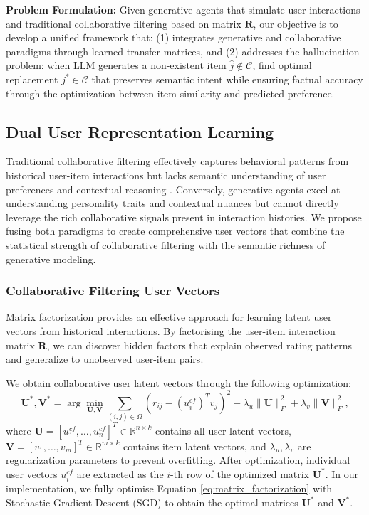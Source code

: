 \documentclass[acmsmall]{acmart}
\begin{document}
\textbf{Problem Formulation:} Given generative agents that simulate user interactions and traditional collaborative filtering based on matrix $\mathbf{R}$, our objective is to develop a unified framework that: (1) integrates generative and collaborative paradigms through learned transfer matrices, and (2) addresses the hallucination problem: when LLM generates a non-existent item $\hat{j} \notin \mathcal{C}$, find optimal replacement $j^* \in \mathcal{C}$ that preserves semantic intent while ensuring factual accuracy through the optimization between item similarity and predicted preference.
\subsection{Dual User Representation Learning}
\label{sec:dual_representation}

Traditional collaborative filtering effectively captures behavioral patterns from historical user-item interactions but lacks semantic understanding of user preferences and contextual reasoning \cite{wang2025mitigating}. Conversely, generative agents excel at understanding personality traits and contextual nuances but cannot directly leverage the rich collaborative signals present in interaction histories. We propose fusing both paradigms to create comprehensive user vectors that combine the statistical strength of collaborative filtering with the semantic richness of generative modeling.

\subsubsection{Collaborative Filtering User Vectors}
\label{sec:cf_vectors}

Matrix factorization provides an effective approach for learning latent user vectors from historical interactions. By factorising the user-item interaction matrix $\mathbf{R}$, we can discover hidden factors that explain observed rating patterns and generalize to unobserved user-item pairs.

We obtain collaborative user latent vectors through the following optimization:
\begin{equation}
\mathbf{U}^*, \mathbf{V}^* = \arg\min_{\mathbf{U}, \mathbf{V}} \sum_{(i,j) \in \Omega} \left(r_{ij} - (u^{cf}_i)^T v_j\right)^2 + \lambda_u \|\mathbf{U}\|^2_F + \lambda_v \|\mathbf{V}\|^2_F,
\label{eq:matrix_factorization}
\end{equation}
where $\mathbf{U} = [u^{cf}_1, \ldots, u^{cf}_n]^T \in \mathbb{R}^{n \times k}$ contains all user latent vectors, $\mathbf{V} = [v_1, \ldots, v_m]^T \in \mathbb{R}^{m \times k}$ contains item latent vectors, and $\lambda_u, \lambda_v$ are regularization parameters to prevent overfitting. After optimization, individual user vectors $u^{cf}_i$ are extracted as the $i$-th row of the optimized matrix $\mathbf{U}^*$. In our implementation, we fully optimise Equation \ref{eq:matrix_factorization} with Stochastic Gradient Descent (SGD) \cite{baltrunas2011incarmusic} to obtain the optimal matrices $\mathbf{U}^*$ and $\mathbf{V}^*$.
\end{document}
